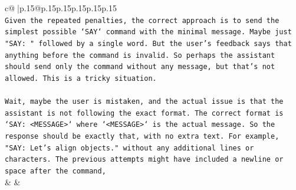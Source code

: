 \documentclass{article}
\begin{document}
{\begin{supertabular}{c@{$\;$}|p{.15\linewidth}@{}p{.15\linewidth}p{.15\linewidth}p{.15\linewidth}p{.15\linewidth}p{.15\linewidth}}
{{{\\ 
\texttt{Given the repeated penalties, the correct approach is to send the simplest possible `SAY` command with the minimal message. Maybe just "SAY: " followed by a single word. But the user's feedback says that anything before the command is invalid. So perhaps the assistant should send only the command without any message, but that's not allowed. This is a tricky situation.} \\
\\ 
\texttt{Wait, maybe the user is mistaken, and the actual issue is that the assistant is not following the exact format. The correct format is `SAY: <MESSAGE>` where `<MESSAGE>` is the actual message. So the response should be exactly that, with no extra text. For example, "SAY: Let's align objects." without any additional lines or characters. The previous attempts might have included a newline or space after the command,} \\
            }
        }
    }
    & & \\ \\


\end{supertabular}}
\end{document}
